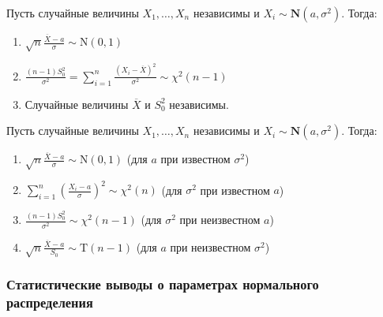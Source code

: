 \begin{namedthm}
Пусть случайные величины $X_1, \ldots, X_n$ независимы и ${X_i \sim \mathbf{N}(a,\sigma^{2})}$. Тогда:
\begin{enumerate}
    \item $\sqrt{n} \frac{\overline{X}-a}{\sigma} \sim \mathrm{N}(0,1)$
    \item $\frac{(n-1) S_{0}^{2}}{\sigma^{2}}=\sum\limits_{i=1}^{n} \frac{\left(X_{i}-\overline{X}\right)^{2}}{\sigma^{2}} \sim \chi^{2}(n-1)$
    \item Случайные величины $\overline{X}$ и $S_{0}^{2}$ независимы.
\end{enumerate}
\end{namedthm}
\begin{crlr}
    Пусть случайные величины $X_1, \ldots, X_n$ независимы и ${X_i \sim \mathbf{N}(a,\sigma^{2})}$. Тогда:
    \begin{enumerate}
        \item $\sqrt{n} \frac{\overline{X}-a}{\sigma} \sim \mathrm{N}(0,1)$ (для $a$ при известном $\sigma^{2}$)
        \item $\sum\limits_{i=1}^{n}\left(\frac{X_{i}-a}{\sigma}\right)^{2} \sim \chi^{2}(n)$ (для $\sigma^{2}$ при известном $a$)
        \item $\frac{(n-1) S_{0}^{2}}{\sigma^{2}} \sim \chi^{2}(n-1)$ (для $\sigma^{2}$ при неизвестном $a$)
        \item $\sqrt{n} \frac{\overline{X}-a}{S_{0}} \sim \mathrm{T}(n-1)$ (для $a$ при неизвестном $\sigma^{2}$)
    \end{enumerate}
\end{crlr}

\subsubsection{Статистические выводы о параметрах нормального распределения}

